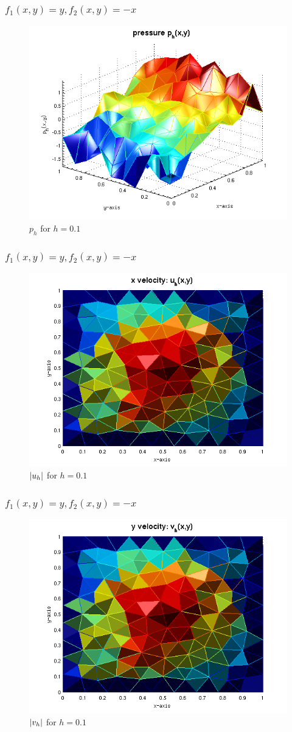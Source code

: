 \documentclass{beamer}
\begin{document}
\begin{frame}
    \frametitle{$f_1(x,y) = y, f_2(x,y) = -x$}
\begin{figure}
\includegraphics[width=0.5\linewidth]{./p1.png}
\caption{$p_h$ for $h=0.1$}
\end{figure}
\end{frame}

\begin{frame}
    \frametitle{$f_1(x,y) = y, f_2(x,y) = -x$}
\begin{figure}
    \includegraphics[width=0.5\linewidth]{./magu_1.png}
\caption{$\left|u_h\right|$ for $h=0.1$}
\end{figure}
\end{frame}

\begin{frame}
    \frametitle{$f_1(x,y) = y, f_2(x,y) = -x$}
\begin{figure}
\includegraphics[width=0.5\linewidth]{./magv_1.png}
\caption{$\left|v_h\right|$ for $h=0.1$}
\end{figure}
\end{frame}
\end{document}
